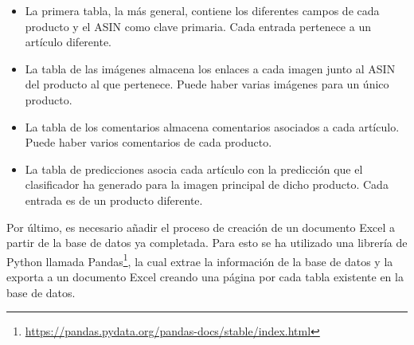 \begin{itemize}
    \item La primera tabla, la más general, contiene los diferentes campos de cada producto y el ASIN como clave primaria. Cada entrada pertenece a un artículo diferente.
    \item La tabla de las imágenes almacena los enlaces a cada imagen junto al ASIN del producto al que pertenece. Puede haber varias imágenes para un único producto.
    \item La tabla de los comentarios almacena comentarios asociados a cada artículo. Puede haber varios comentarios de cada producto.
    \item La tabla de predicciones asocia cada artículo con la predicción que el clasificador ha generado para la imagen principal de dicho producto. Cada entrada es de un producto diferente.
\end{itemize}

Por último, es necesario añadir el proceso de creación de un documento Excel a partir de la base de datos ya completada. Para esto se ha utilizado una librería de Python llamada Pandas\footnote{\url{https://pandas.pydata.org/pandas-docs/stable/index.html}}, la cual extrae la información de la base de datos y la exporta a un documento Excel creando una página por cada tabla existente en la base de datos.

